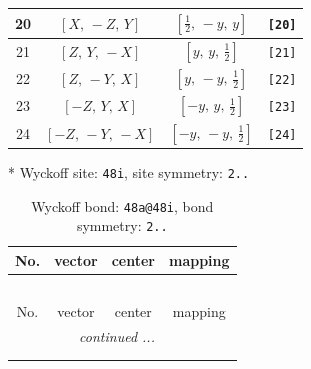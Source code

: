 \documentclass[fleqn,8pt]{jsarticle}
\begin{document}
\begin{longtable}{cccc}
20 & $\left[ X,\, - Z,\, Y \right]$ & $\left[ \frac{1}{2},\, - y,\, y \right]$ & {\tt [20]} \\ \hline
21 & $\left[ Z,\, Y,\, - X \right]$ & $\left[ y,\, y,\, \frac{1}{2} \right]$ & {\tt [21]} \\ \hline
22 & $\left[ Z,\, - Y,\, X \right]$ & $\left[ y,\, - y,\, \frac{1}{2} \right]$ & {\tt [22]} \\ \hline
23 & $\left[ - Z,\, Y,\, X \right]$ & $\left[ - y,\, y,\, \frac{1}{2} \right]$ & {\tt [23]} \\ \hline
24 & $\left[ - Z,\, - Y,\, - X \right]$ & $\left[ - y,\, - y,\, \frac{1}{2} \right]$ & {\tt [24]} \\
\end{longtable}
* Wyckoff site: {\tt 48i}, site symmetry: {\tt 2..}
\renewcommand{\arraystretch}{1.2}
\begin{longtable}{cccc}
\caption{Wyckoff bond: {\tt 48a@48i}, bond symmetry: {\tt 2..}}
 \\
 \hline \hline
No. & vector & center & mapping \\ \hline \endfirsthead

\multicolumn{3}{l}{\tablename\ \thetable{}} \\
 \hline \hline
No. & vector & center & mapping \\ \hline \endhead

 \hline \hline
\multicolumn{3}{r}{\footnotesize\it continued ...} \\ \endfoot

 \hline \hline
\multicolumn{3}{r}{} \\ \endlastfoot


\end{longtable}
\end{document}
